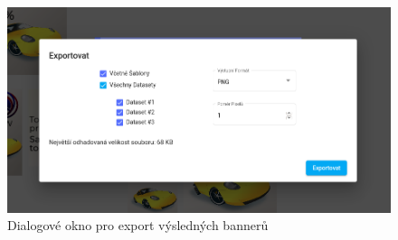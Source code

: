     \begin{figure}[h]
        \includegraphics[width=1.0\textwidth]{Figures/editor/export-dialog.png}
        \caption{Dialogové okno pro export výsledných bannerů}
        \label{fig:editor:exporting}
    \end{figure}




\endinput
